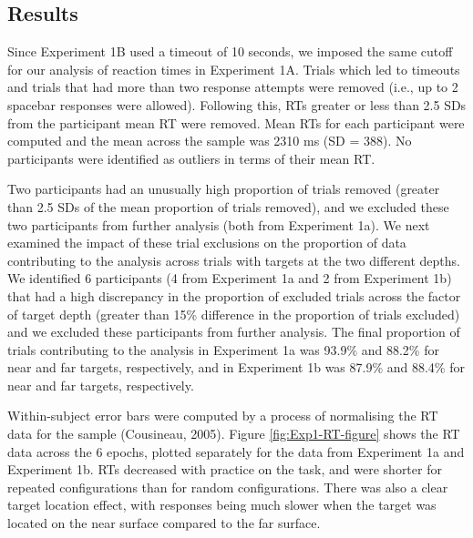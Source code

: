 \documentclass[
  english,
  man,floatsintext]{apa7}
\begin{document}
\hypertarget{results}{%
\subsection{Results}\label{results}}

Since Experiment 1B used a timeout of 10 seconds, we imposed the same cutoff for our analysis of reaction times in Experiment 1A. Trials which led to timeouts and trials that had more than two response attempts were removed (i.e., up to 2 spacebar responses were allowed). Following this, RTs greater or less than 2.5 SDs from the participant mean RT were removed. Mean RTs for each participant were computed and the mean across the sample was 2310 ms (SD = 388). No participants were identified as outliers in terms of their mean RT.

Two participants had an unusually high proportion of trials removed (greater than 2.5 SDs of the mean proportion of trials removed), and we excluded these two participants from further analysis (both from Experiment 1a). We next examined the impact of these trial exclusions on the proportion of data contributing to the analysis across trials with targets at the two different depths. We identified 6 participants (4 from Experiment 1a and 2 from Experiment 1b) that had a high discrepancy in the proportion of excluded trials across the factor of target depth (greater than 15\% difference in the proportion of trials excluded) and we excluded these participants from further analysis. The final proportion of trials contributing to the analysis in Experiment 1a was 93.9\% and 88.2\% for near and far targets, respectively, and in Experiment 1b was 87.9\% and 88.4\% for near and far targets, respectively.

Within-subject error bars were computed by a process of normalising the RT data for the sample (Cousineau, 2005). Figure \ref{fig:Exp1-RT-figure} shows the RT data across the 6 epochs, plotted separately for the data from Experiment 1a and Experiment 1b. RTs decreased with practice on the task, and were shorter for repeated configurations than for random configurations. There was also a clear target location effect, with responses being much slower when the target was located on the near surface compared to the far surface.
\end{document}
